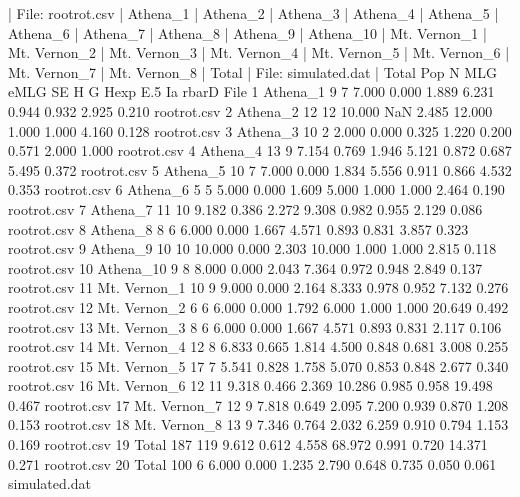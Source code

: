 \documentclass[letterpaper]{article}
\begin{document}
\begin{Schunk}
\begin{Soutput}
| File:  rootrot.csv 
| Athena_1 
| Athena_2 
| Athena_3 
| Athena_4 
| Athena_5 
| Athena_6 
| Athena_7 
| Athena_8 
| Athena_9 
| Athena_10 
| Mt. Vernon_1 
| Mt. Vernon_2 
| Mt. Vernon_3 
| Mt. Vernon_4 
| Mt. Vernon_5 
| Mt. Vernon_6 
| Mt. Vernon_7 
| Mt. Vernon_8 
| Total 
| File:  simulated.dat 
| Total 
            Pop   N MLG   eMLG    SE     H      G  Hexp   E.5     Ia rbarD          File
1      Athena_1   9   7  7.000 0.000 1.889  6.231 0.944 0.932  2.925 0.210   rootrot.csv
2      Athena_2  12  12 10.000   NaN 2.485 12.000 1.000 1.000  4.160 0.128   rootrot.csv
3      Athena_3  10   2  2.000 0.000 0.325  1.220 0.200 0.571  2.000 1.000   rootrot.csv
4      Athena_4  13   9  7.154 0.769 1.946  5.121 0.872 0.687  5.495 0.372   rootrot.csv
5      Athena_5  10   7  7.000 0.000 1.834  5.556 0.911 0.866  4.532 0.353   rootrot.csv
6      Athena_6   5   5  5.000 0.000 1.609  5.000 1.000 1.000  2.464 0.190   rootrot.csv
7      Athena_7  11  10  9.182 0.386 2.272  9.308 0.982 0.955  2.129 0.086   rootrot.csv
8      Athena_8   8   6  6.000 0.000 1.667  4.571 0.893 0.831  3.857 0.323   rootrot.csv
9      Athena_9  10  10 10.000 0.000 2.303 10.000 1.000 1.000  2.815 0.118   rootrot.csv
10    Athena_10   9   8  8.000 0.000 2.043  7.364 0.972 0.948  2.849 0.137   rootrot.csv
11 Mt. Vernon_1  10   9  9.000 0.000 2.164  8.333 0.978 0.952  7.132 0.276   rootrot.csv
12 Mt. Vernon_2   6   6  6.000 0.000 1.792  6.000 1.000 1.000 20.649 0.492   rootrot.csv
13 Mt. Vernon_3   8   6  6.000 0.000 1.667  4.571 0.893 0.831  2.117 0.106   rootrot.csv
14 Mt. Vernon_4  12   8  6.833 0.665 1.814  4.500 0.848 0.681  3.008 0.255   rootrot.csv
15 Mt. Vernon_5  17   7  5.541 0.828 1.758  5.070 0.853 0.848  2.677 0.340   rootrot.csv
16 Mt. Vernon_6  12  11  9.318 0.466 2.369 10.286 0.985 0.958 19.498 0.467   rootrot.csv
17 Mt. Vernon_7  12   9  7.818 0.649 2.095  7.200 0.939 0.870  1.208 0.153   rootrot.csv
18 Mt. Vernon_8  13   9  7.346 0.764 2.032  6.259 0.910 0.794  1.153 0.169   rootrot.csv
19        Total 187 119  9.612 0.612 4.558 68.972 0.991 0.720 14.371 0.271   rootrot.csv
20        Total 100   6  6.000 0.000 1.235  2.790 0.648 0.735  0.050 0.061 simulated.dat
\end{Soutput}
\end{Schunk}
\end{document}
